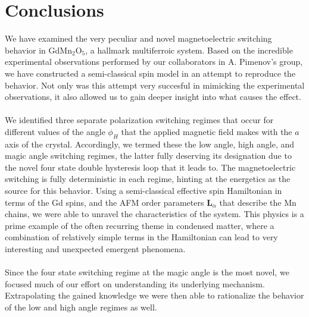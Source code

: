 \section{Conclusions}
We have examined the very peculiar and novel magnetoelectric switching behavior in GdMn$_2$O$_5$, a hallmark multiferroic system.
Based on the incredible experimental observations performed by our collaborators in A. Pimenov's group, we have constructed a semi-classical spin model in an attempt to reproduce the behavior.
Not only was this attempt very succesful in mimicking the experimental observations, it also allowed us to gain deeper insight into what causes the effect.
\\\\
We identified three separate polarization switching regimes that occur for different values of the angle $\phi_H$ that the applied magnetic field makes with the $a$ axis of the crystal.
Accordingly, we termed these the low angle, high angle, and magic angle switching regimes, the latter fully deserving its designation due to the novel four state double hysteresis loop that it leads to.
The magnetoelectric switching is fully deterministic in each regime, hinting at the energetics as the source for this behavior.
Using a semi-classical effective spin Hamiltonian in terms of the Gd spins, and the AFM order parameters $\bm L_\alpha$ that describe the Mn chains, we were able to unravel the characteristics of the system.
This physics is a prime example of the often recurring theme in condensed matter, where a combination of relatively simple terms in the Hamiltonian can lead to very interesting and unexpected emergent phenomena.
\\\\
Since the four state switching regime at the magic angle is the most novel, we focused much of our effort on understanding its underlying mechanism. Extrapolating the gained knowledge we were then able to rationalize the behavior of the low and high angle regimes as well.

